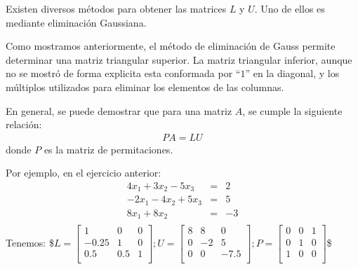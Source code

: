 \documentclass[letterpaper,10pt,english]{jupyterBook}
\begin{document}
\sphinxAtStartPar
Existen diversos métodos para obtener las matrices \(L\) y \(U\). Uno de ellos es mediante eliminación Gaussiana.

\sphinxAtStartPar
Como mostramos anteriormente, el método de eliminación de Gauss permite determinar una matriz triangular superior. La matriz triangular inferior, aunque no se mostró de forma explicita esta conformada por “\(1\)” en la diagonal, y los múltiplos utilizados para eliminar los elementos de las columnas.

\sphinxAtStartPar
En general, se puede demostrar que para una matriz \(A\), se cumple la siguiente relación:
\begin{equation*}
\begin{split}PA = LU\end{split}
\end{equation*}
\sphinxAtStartPar
donde \(P\) es la matriz de permitaciones.

\sphinxAtStartPar
Por ejemplo, en el ejercicio anterior:
\begin{eqnarray*}
4x_1 + 3x_2 - 5x_3 &=& 2 \\
-2x_1 - 4x_2 + 5x_3 &=& 5 \\
8x_1 + 8x_2  &=& -3 \\
\end{eqnarray*}
\sphinxAtStartPar
Tenemos:
\$\(
L  = \begin{bmatrix}
1 & 0 & 0 \\
-0.25 & 1 & 0 \\
0.5 & 0.5 & 1 \\
\end{bmatrix};
U  = \begin{bmatrix}
8 & 8 & 0 \\
0 & -2 & 5 \\
0 & 0 & -7.5 \\
\end{bmatrix}; 
P  = \begin{bmatrix}
0 & 0 & 1 \\
0 & 1 & 0 \\
1 & 0 & 0 \\
\end{bmatrix}\)\$
\end{document}
